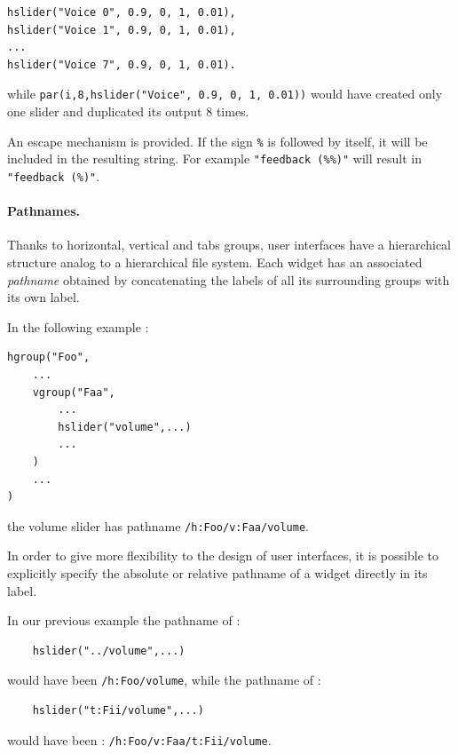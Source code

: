 \documentclass[a4paper]{book}
\begin{document}
\begin{lstlisting}
hslider("Voice 0", 0.9, 0, 1, 0.01),
hslider("Voice 1", 0.9, 0, 1, 0.01),
...
hslider("Voice 7", 0.9, 0, 1, 0.01).
\end{lstlisting}

while \lstinline'par(i,8,hslider("Voice", 0.9, 0, 1, 0.01))' would have created only one slider and duplicated its output 8 times.


An escape mechanism is provided.
If the sign \lstinline'%' is followed by itself, it will be included in the resulting string.
For example \lstinline'"feedback (%%)"' will result in \lstinline'"feedback (%)"'.

\paragraph{Pathnames.}
Thanks to horizontal, vertical and tabs groups, user interfaces have a hierarchical structure analog to a hierarchical file system. Each widget has an associated \textit{pathname} obtained by concatenating the labels of all its surrounding groups with its own label.

In the following example :
\begin{lstlisting}
hgroup("Foo",
	...
	vgroup("Faa", 
		...
		hslider("volume",...)
		...
	)
	...
)
\end{lstlisting}
the volume slider has pathname \lstinline'/h:Foo/v:Faa/volume'.

In order to give more flexibility to the design of user interfaces, it is possible to explicitly specify the absolute or relative pathname of a widget directly in its label. 

In our previous example the pathname of :
\begin{lstlisting}
	hslider("../volume",...)
\end{lstlisting}
would have been \lstinline'/h:Foo/volume', while the pathname of :
\begin{lstlisting}
	hslider("t:Fii/volume",...)
\end{lstlisting}
would have been : 
\lstinline'/h:Foo/v:Faa/t:Fii/volume'.
\end{document}
